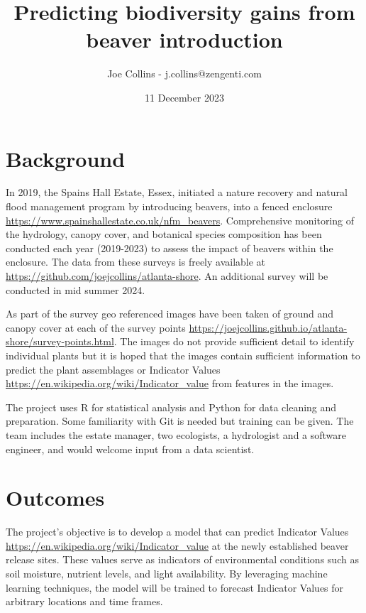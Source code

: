 \documentclass{roles}
\title{Predicting biodiversity gains from beaver introduction}
\author{Joe Collins - j.collins@zengenti.com}
\date{11 December 2023}
\begin{document}
\maketitle

\section*{Background}

In 2019, the Spains Hall Estate, Essex,
initiated a nature recovery and natural flood management program by introducing beavers,
into a fenced enclosure 
\href{https://www.spainshallestate.co.uk/nfm\_beavers}{https://www.spainshallestate.co.uk/nfm\_beavers}.
Comprehensive monitoring of
the hydrology, canopy cover, and botanical species composition
has been conducted each year (2019-2023)
to assess the impact of beavers within the enclosure.
The data from these surveys is freely available at 
\href{https://github.com/joejcollins/atlanta-shore}{https://github.com/joejcollins/atlanta-shore}.
An additional survey will be conducted in mid summer 2024.

As part of the survey geo referenced images have been taken
of ground and canopy cover at each of the survey points 
\href{https://joejcollins.github.io/atlanta-shore/survey-points.html}{https://joejcollins.github.io/atlanta-shore/survey-points.html}.
The images do not provide sufficient detail to identify individual plants
but it is hoped that the images contain sufficient information to predict
the plant assemblages or Indicator Values 
\href{https://en.wikipedia.org/wiki/Indicator\_value}{https://en.wikipedia.org/wiki/Indicator\_value}
from features in the images.

The project uses R for statistical analysis and Python for data cleaning and preparation.
Some familiarity with Git is needed but training can be given.
The team includes the estate manager, two ecologists, a hydrologist and a software engineer,
and would welcome input from a data scientist.
\section*{Outcomes}

The project's objective is to develop a model
that can predict Indicator Values
\href{https://en.wikipedia.org/wiki/Indicator\_value}{https://en.wikipedia.org/wiki/Indicator\_value}
at the newly established beaver release sites.
These values serve as indicators of environmental conditions such as
soil moisture, nutrient levels, and light availability.
By leveraging machine learning techniques,
the model will be trained to forecast Indicator Values for arbitrary locations and time frames.
\end{document}
